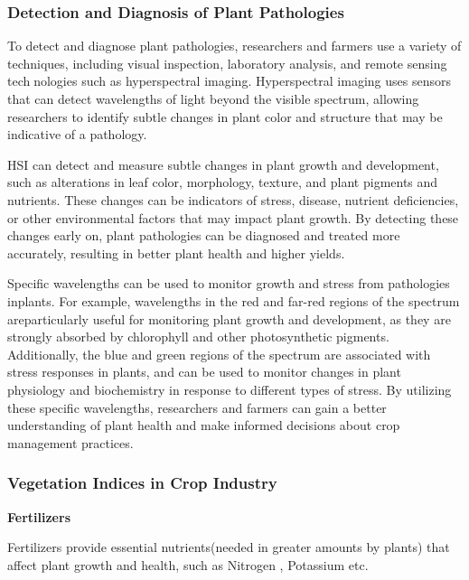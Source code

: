\documentclass{article}
\begin{document}
{                \subsubsection{Detection and Diagnosis of Plant Pathologies}
                \hspace{0.5cm}To detect and diagnose plant pathologies, researchers and farmers use a variety of techniques, including visual inspection, laboratory analysis, and remote sensing technologies such as hyperspectral imaging. Hyperspectral imaging uses sensors that can detect wavelengths of light beyond the visible spectrum, allowing researchers to identify subtle changes in plant color and structure that may be indicative of a pathology.\par
                HSI can detect and measure subtle changes in plant growth and development, such as alterations in leaf color, morphology, texture, and plant pigments and nutrients. These changes can be indicators of stress, disease, nutrient deficiencies, or other environmental factors that may impact plant growth. By detecting these changes early on, plant pathologies can be diagnosed and treated more accurately, resulting in better plant health and higher yields.\par
                Specific wavelengths can be used to monitor growth and stress from pathologies inplants. For example, wavelengths in the red and far-red regions of the spectrum areparticularly useful for monitoring plant growth and development, as they are strongly absorbed by chlorophyll and other photosynthetic pigments. Additionally, the blue and green regions of the spectrum are associated with stress responses in plants, and can be used to monitor changes in plant physiology and biochemistry in response to different types of stress. By utilizing these specific wavelengths, researchers and farmers can gain a better understanding of plant health and make informed decisions about crop management practices.\cite{Watterich CB}
                
                \subsubsection{Vegetation Indices in Crop Industry}
                \vspace{1\baselineskip}
                \textbf{Fertilizers}
                
                Fertilizers provide essential nutrients(needed in greater amounts by plants) that affect plant growth and health, such as Nitrogen , Potassium etc.\par
                
}
\end{document}
